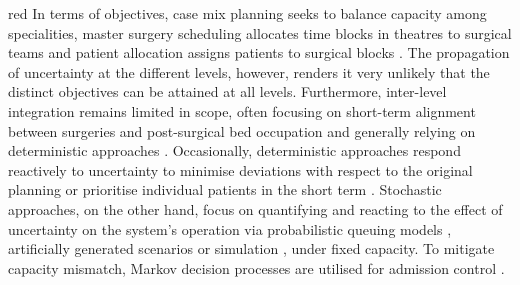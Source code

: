 \documentclass[review,3p,authoryear]{elsarticle}
\begin{document}
\begin{color}{red}
In terms of objectives, case mix planning seeks to balance capacity among specialities, master surgery scheduling allocates time blocks in theatres to surgical teams and patient allocation assigns patients to surgical blocks \citep{wang2021operating,Melo2025}. The propagation of uncertainty at the different levels, however, renders it very unlikely that the distinct objectives can be attained at all levels. 
%
Furthermore, inter-level integration remains limited in scope, often focusing on short-term alignment between surgeries and post-surgical bed occupation and generally relying on deterministic approaches \citep{Melo2025,Siqueira2018INTO}. Occasionally, deterministic approaches respond reactively to uncertainty to minimise deviations with respect to the original planning \citep{VanHuele2015,Calegari2025} or prioritise individual patients in the short term \citep{Mashkani2023}. Stochastic approaches, on the other hand, focus on quantifying and reacting to the effect of uncertainty on the system's operation via probabilistic queuing models \citep{Fugener2015,Dellaert2016}, artificially generated scenarios \citep{shehadeh2022stochastic,zhang2021two} or simulation \citep{Samudra2017,Freeman2018,Bovim2020}, under fixed capacity. To mitigate capacity mismatch, Markov decision processes are utilised for admission control \citep{Barz2015,zhang2021two,Zhu2022}.

\end{color}


\end{document}
